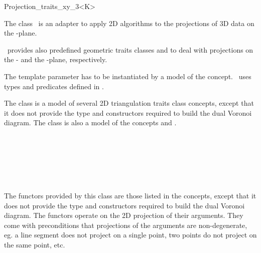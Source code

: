 
\begin{ccRefClass}{Projection_traits_xy_3<K>}  %

\ccDefinition
  
The class \ccRefName\ is an adapter to apply 2D algorithms to the projections of 3D data on the -plane.


\cgal\ provides also predefined geometric traits classes
 and
 to
deal with projections on the
 - and  the -plane,
respectively.  

\ccParameters
The template parameter   has to
be instantiated by a model of the  concept.
\ccRefName\ uses types 
and predicates defined in .


\ccIsModel

The class is a model of several 2D triangulation traits class concepts,
except that it does not provide the type and constructors
required to build the dual Voronoi diagram. The class is also a model
of the concepts  and .

 \\
 \\
 \\
 \\
 \\

\ccTypes

\ccGlue
{}
\ccGlue
{}
\ccGlue
{}



The functors provided by this class are those listed in the concepts,
except that it does not provide the type and constructors
required to build the dual Voronoi diagram.
The functors operate on the 2D projection of their arguments. They come with preconditions that projections of the arguments are non-degenerate, eg. a line segment does not project on a single point, two points do not project on the same point, etc.


\end{ccRefClass}

